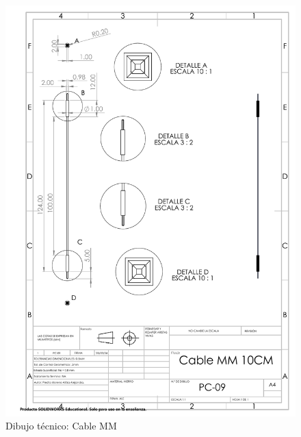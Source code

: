 \begin{figure}[H]
    \centering
    \includegraphics[trim = {7mm 1mm 1mm 1mm},clip,scale=0.4]{22/Img/cableMMDibujo.PDF}
    \caption{Dibujo técnico: Cable MM}
    \label{fig:enter-label9}
\end{figure}

